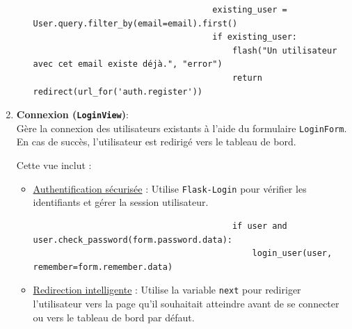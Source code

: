 \documentclass[a4paper,11pt]{article}
\begin{document}
\begin{enumerate}
\begin{itemize}
                            \begin{tcolorbox}[colback=lightgray!6, colframe=black, left=-60mm, right=5mm, top=2mm, bottom=0mm, boxrule=0.1mm]
                                \begin{verbatim}
                                    existing_user = User.query.filter_by(email=email).first()
                                    if existing_user:
                                        flash("Un utilisateur avec cet email existe déjà.", "error")
                                        return redirect(url_for('auth.register'))
                                \end{verbatim}
                            \end{tcolorbox}
                        \end{itemize}

                    \item \textbf{Connexion (\texttt{LoginView})}:\\
                        \noindent Gère la connexion des utilisateurs existants à l'aide du formulaire \texttt{LoginForm}. En cas de succès, l'utilisateur est redirigé vers le tableau de bord.

                        \noindent Cette vue inclut :

                        \begin{itemize}
                            \item \underline{Authentification sécurisée} : Utilise \texttt{Flask-Login} pour vérifier les identifiants et gérer la session utilisateur.

                                \begin{tcolorbox}[colback=lightgray!6, colframe=black, left=-60mm, right=5mm, top=2mm, bottom=0mm, boxrule=0.1mm]
                                    \begin{verbatim}
                                        if user and user.check_password(form.password.data):
                                            login_user(user, remember=form.remember.data)
                                    \end{verbatim}
                                \end{tcolorbox}

                            \item \underline{Redirection intelligente} : Utilise la variable \texttt{next} pour rediriger l'utilisateur vers la page qu'il souhaitait atteindre avant de se connecter ou vers le tableau de bord par défaut.


\end{itemize}
\end{enumerate}
\end{document}
